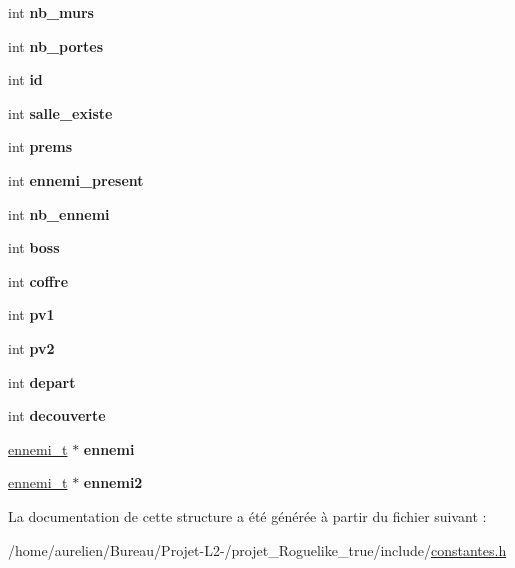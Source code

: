 \begin{DoxyCompactItemize}
\mbox{\label{structsalle__s_a542dee312ccd6acb9fa9419f78a070c4}} 
int {\bfseries nb\+\_\+murs}
\item 
\mbox{\label{structsalle__s_a66ec62d75b2c95e9f6928f442fe262da}} 
int {\bfseries nb\+\_\+portes}
\item 
\mbox{\label{structsalle__s_a875e8df0e9b8fd190dc4d210e49a03bb}} 
int {\bfseries id}
\item 
\mbox{\label{structsalle__s_ad82fc1e9e39f7a39b7fc26ea2d01bed3}} 
int {\bfseries salle\+\_\+existe}
\item 
\mbox{\label{structsalle__s_a28ed75fdfae4793b20549225e6f0ad35}} 
int {\bfseries prems}
\item 
\mbox{\label{structsalle__s_a5b8d8ce1581c10a220e9fb3daeff85fe}} 
int {\bfseries ennemi\+\_\+present}
\item 
\mbox{\label{structsalle__s_aa9b7b9a0e427a86cd11b7d7db6b7ba90}} 
int {\bfseries nb\+\_\+ennemi}
\item 
\mbox{\label{structsalle__s_ad17193c93b46d17d67cd46b4e6cec7b4}} 
int {\bfseries boss}
\item 
\mbox{\label{structsalle__s_a77dab6f8e75e2abf315024ecce4a60af}} 
int {\bfseries coffre}
\item 
\mbox{\label{structsalle__s_aefb3569c69744d6ff74ba2c77dd68a4d}} 
int {\bfseries pv1}
\item 
\mbox{\label{structsalle__s_a0b49d0ed35dddea8baebbb3e95030474}} 
int {\bfseries pv2}
\item 
\mbox{\label{structsalle__s_a6e8d9e79a7705096986b49b035841771}} 
int {\bfseries depart}
\item 
\mbox{\label{structsalle__s_a31564b120c85a392581dea2042ab7fa8}} 
int {\bfseries decouverte}
\item 
\mbox{\label{structsalle__s_a0afc9a6b09a8602a7efa1b6bab4f887f}} 
\hyperlink{structennemi__t}{ennemi\+\_\+t} $\ast$ {\bfseries ennemi}
\item 
\mbox{\label{structsalle__s_ab6da3a748e02d0b4ed29c3fcd0fb3604}} 
\hyperlink{structennemi__t}{ennemi\+\_\+t} $\ast$ {\bfseries ennemi2}
\end{DoxyCompactItemize}


La documentation de cette structure a été générée à partir du fichier suivant \+:\begin{DoxyCompactItemize}
\item 
/home/aurelien/\+Bureau/\+Projet-\/\+L2-\//projet\+\_\+\+Roguelike\+\_\+true/include/\hyperlink{constantes_8h}{constantes.\+h}\end{DoxyCompactItemize}

